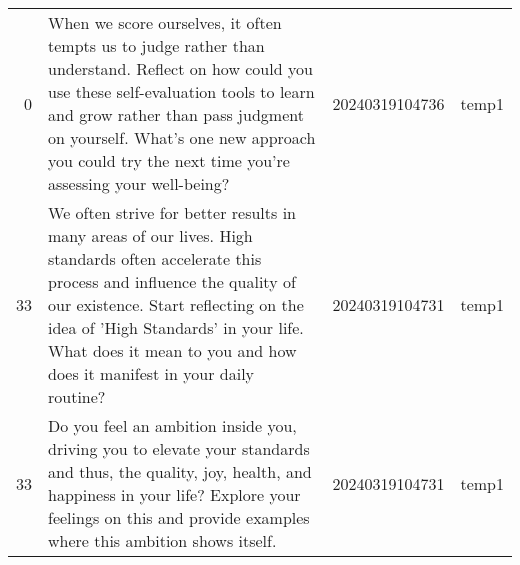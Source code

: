 \begin{longtable}{rlll}
  0 &                                                                                                                                                                                                                                                                                                                                                                                                                                                                                                                                                                                                                                                                                When we score ourselves, it often tempts us to judge rather than understand. Reflect on how could you use these self-evaluation tools to learn and grow rather than pass judgment on yourself. What's one new approach you could try the next time you're assessing your well-being? & 20240319104736 &       temp1 \\
 33 &                                                                                                                                                                                                                                                                                                                                                                                                                                                                                                                                                                                                                                                                     We often strive for better results in many areas of our lives. High standards often accelerate this process and influence the quality of our existence. Start reflecting on the idea of 'High Standards' in your life. What does it mean to you and how does it manifest in your daily routine? & 20240319104731 &       temp1 \\
 33 &                                                                                                                                                                                                                                                                                                                                                                                                                                                                                                                                                                                                                                                                                                                                      Do you feel an ambition inside you, driving you to elevate your standards and thus, the quality, joy, health, and happiness in your life? Explore your feelings on this and provide examples where this ambition shows itself. & 20240319104731 &       temp1 \\

\end{longtable}
